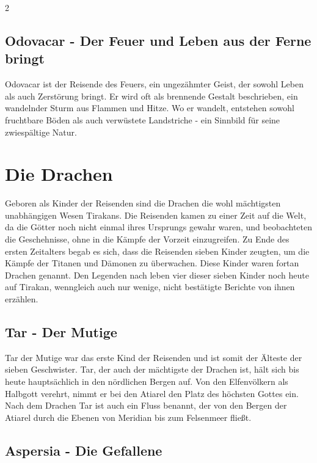 \begin{multicols*}{2}
\subsection{Odovacar - Der Feuer und Leben aus der Ferne bringt}\label{subsec:odovacar-der-feuer-und-leben-aus-der-ferne-bringt}

Odovacar ist der Reisende des Feuers, ein ungezähmter Geist, der sowohl Leben als auch Zerstörung bringt.
Er wird oft als brennende Gestalt beschrieben, ein wandelnder Sturm aus Flammen und Hitze.
Wo er wandelt, entstehen sowohl fruchtbare Böden als auch verwüstete Landstriche - ein Sinnbild für seine zwiespältige Natur.


\section{Die Drachen}\label{sec:die-drachen}

Geboren als Kinder der Reisenden sind die Drachen die wohl mächtigsten unabhängigen Wesen Tirakans.
Die Reisenden kamen zu einer Zeit auf die Welt, da die Götter noch nicht einmal ihres Ursprungs gewahr waren, und beobachteten die Geschehnisse, ohne in die Kämpfe der Vorzeit einzugreifen.
Zu Ende des ersten Zeitalters begab es sich, dass die Reisenden sieben Kinder zeugten, um die Kämpfe der Titanen und Dämonen zu überwachen.
Diese Kinder waren fortan Drachen genannt.
Den Legenden nach leben vier dieser sieben Kinder noch heute auf Tirakan, wenngleich auch nur wenige, nicht bestätigte Berichte von ihnen erzählen.

\subsection{Tar - Der Mutige}\label{subsec:tar-der-mutige}

Tar der Mutige war das erste Kind der Reisenden und ist somit der Älteste der sieben Geschwister.
Tar, der auch der mächtigste der Drachen ist, hält sich bis heute hauptsächlich in den nördlichen Bergen auf.
Von den Elfenvölkern als Halbgott verehrt, nimmt er bei den Atiarel den Platz des höchsten Gottes ein.
Nach dem Drachen Tar ist auch ein Fluss benannt, der von den Bergen der Atiarel durch die Ebenen von Meridian bis zum Felsenmeer fließt.

\subsection{Aspersia - Die Gefallene}\label{subsec:aspersia-die-gefallene}


\end{multicols*}
